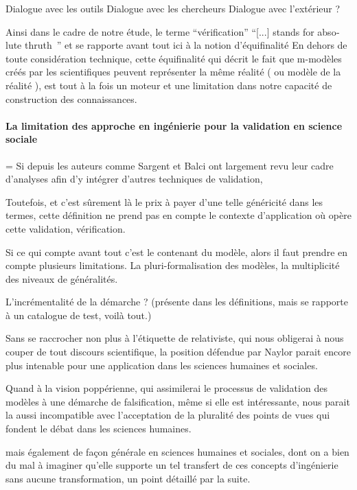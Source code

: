 Dialogue avec les outils
Dialogue avec les chercheurs
Dialogue avec l'extérieur
?

Ainsi dans le cadre de notre étude, le terme \enquote{vérification}  \foreignquote{english}{[...] stands for absolute thruth }  \autocite{Oreskes1994} et se rapporte avant tout ici à la notion d'équifinalité \autocite{OSullivan2004} En dehors de toute considération technique, cette équifinalité qui décrit le fait que m-modèles créés par les scientifiques peuvent représenter la même réalité ( ou modèle de la réalité ), est tout à la fois un moteur et une limitation dans notre capacité de construction des connaissances.


\paragraph{La limitation des approche en ingénierie pour la validation en science sociale}

= Si depuis les auteurs comme Sargent et Balci ont largement revu leur cadre d'analyses afin d'y intégrer d'autres techniques de validation,

Toutefois, et c'est sûrement là le prix à payer d'une telle généricité dans les termes, cette définition ne prend pas en compte le contexte d'application où opère cette validation, vérification.

Si ce qui compte avant tout c'est le contenant du modèle, alors il faut prendre en compte plusieurs limitations. La pluri-formalisation des modèles, la multiplicité des niveaux de généralités.

L'incrémentalité de la démarche ? (présente dans les définitions, mais se rapporte à un catalogue de test, voilà tout.)

Sans se raccrocher non plus à l'étiquette de relativiste, qui nous obligerai à nous couper de tout discours scientifique, la position défendue par Naylor parait encore plus intenable pour une application dans les sciences humaines et sociales.

Quand à la vision poppérienne, qui assimilerai le processus de validation des modèles à une démarche de falsification, même si elle est intéressante, nous parait la aussi incompatible avec l'acceptation de la pluralité des points de vues qui fondent le débat dans les sciences humaines.


mais également de façon générale en sciences humaines et sociales, dont on a bien du mal à imaginer qu'elle supporte un tel transfert de ces concepts d’ingénierie sans aucune transformation, un point détaillé par la suite.




